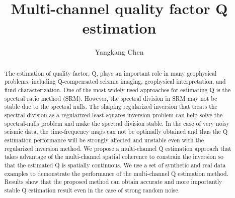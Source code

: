 
\title{Multi-channel quality factor Q estimation}
\renewcommand{\thefootnote}{\fnsymbol{footnote}}
\author{Yangkang Chen\footnotemark[1]}
\maketitle
\address{
\footnotemark[1]
School of Earth Sciences\\
Zhejiang University\\
Hangzhou, Zhejiang Province, China, 310027\\
yangkang.chen@zju.edu.cn 
}


\begin{abstract}
The estimation of quality factor, Q, plays an important role in many geophysical problems, including Q-compensated seismic imaging, geophysical interpretation, and fluid characterization. One of the most widely used approaches for estimating Q is the spectral ratio method (SRM). However, the spectral division in SRM may not be stable due to the spectral nulls. The shaping regularized inversion that treats the spectral division as a regularized least-squares inversion problem can help solve the spectral-nulls problem and make the spectral division stable. In the case of very noisy seismic data, the time-frequency maps can not be optimally obtained and thus the Q estimation performance will be strongly affected and unstable even with the regularized inversion method. We propose a multi-channel Q estimation approach that takes advantage of the multi-channel spatial coherence to constrain the inversion so that the estimated Q is spatially continuous. We use a set of synthetic and real data examples to demonstrate the performance of the multi-channel Q estimation method. Results show that the proposed method can obtain accurate and more importantly stable Q estimation result even in the case of strong random noise.
\end{abstract}


